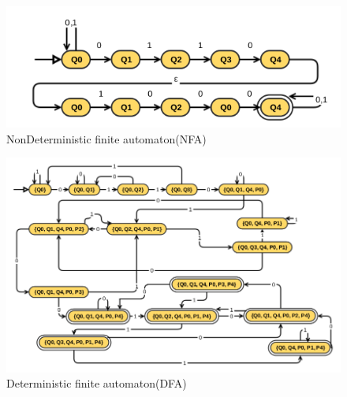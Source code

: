 \begin{figure}[H]
	\includegraphics[scale=0.8]{prac3A.png}
	\caption{NonDeterministic finite automaton(NFA)}
\end{figure}
\begin{figure}[H]
	\includegraphics[scale=0.55]{prac3.png}
	\caption{Deterministic finite automaton(DFA)}
\end{figure}




